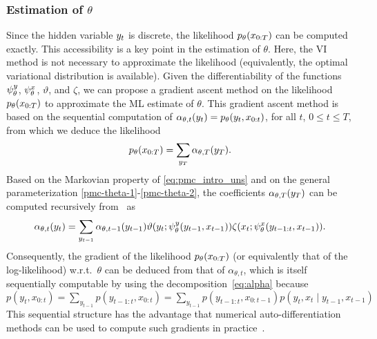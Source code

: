 \subsubsection{Estimation of $\theta$} 


Since the hidden variable $y_t$ is discrete, the likelihood
$p_{\theta}(x_{0:T})$ can be computed exactly. 
This accessibility is a key point in the estimation of $\theta$. 
Here, the VI method is not necessary to approximate the likelihood (equivalently, 
the optimal variational distribution is available).
Given the differentiability of the functions $\psi^{y}_{\theta}$, $\psi^{x}_{\theta}$, $\vartheta$, and
$\zeta$, we can propose a gradient ascent method on the likelihood $p_{\theta}(x_{0:T})$ 
to approximate 
the ML estimate of $\theta$. This gradient ascent method is based on the sequential computation 
of  $\alpha_{\theta,t}(y_t)=p_{\theta}(y_t,x_{0:t})$,
for all $t$, $0 \leq t \leq T$,
from which we deduce the likelihood
\begin{equation}
\label{likelihood-pmc}
p_{\theta}(x_{0:T})=\sum_{y_{T}} \alpha_{\theta,T}(y_{T}) \text{.}
\end{equation}
Based on the Markovian property of \eqref{eq:pmc_intro_uns} and on the general 
parameterization \eqref{pmc-theta-1}-\eqref{pmc-theta-2}, the
coefficients $\alpha_{\theta,T}(y_{T})$ can be computed 
recursively from~\citep{pieczynski2003pairwise} as 
\begin{equation}
\label{eq:alpha}
\alpha_{\theta,t}(y_t)=\sum_{y_{t-1}}\alpha_{\theta,t-1}(y_{t-1}) \vartheta(y_t;\psi^{y}_{\theta}(y_{t-1},x_{t-1})) 
\zeta(x_t;\psi^{x}_{\theta}(y_{t-1:t},x_{t-1})) \text{.}
\end{equation}
Consequently, the gradient of the likelihood $p_{\theta}(x_{0:T})$ 
(or equivalently that of the log-likelihood) w.r.t.~$\theta$ can be
deduced from that of $\alpha_{\theta,t}$,
which is itself sequentially computable
by using the decomposition~\eqref{eq:alpha}  
because \(p(y_t, x_{0:t}) = \sum_{y_{t-1}} p(y_{t-1:t}, x_{0:t}) = 
\sum_{y_{t-1}} p(y_{t-1:t}, x_{0:
t-1}) p(y_t, x_t \mid y_{t-1}, x_{t-1})\)
This sequential structure has the advantage
that numerical auto-differentiation methods
can be used to compute such gradients in practice~\citep{NEURIPS2019_9015}.
